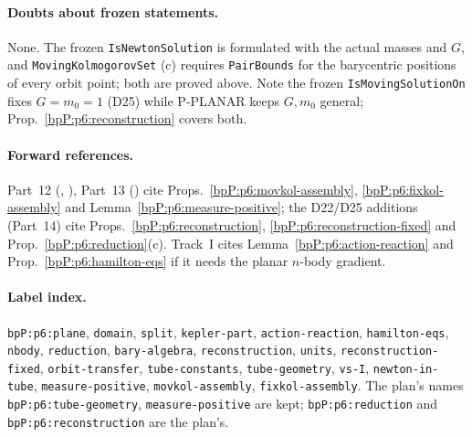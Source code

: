 \paragraph{Doubts about frozen statements.} None. The frozen \texttt{IsNewtonSolution} is formulated with the actual masses and $G$, and \texttt{MovingKolmogorovSet} (c) requires \texttt{PairBounds} for the barycentric positions of every orbit point; both are proved above. Note the frozen \texttt{IsMovingSolutionOn} fixes $G=m_0=1$ (D25) while P-PLANAR keeps $G,m_0$ general; Prop.~\ref{bpP:p6:reconstruction} covers both.

\paragraph{Forward references.} Part~12 (, ), Part~13 () cite Props.~\ref{bpP:p6:movkol-assembly}, \ref{bpP:p6:fixkol-assembly} and Lemma~\ref{bpP:p6:measure-positive}; the D22/D25 additions (Part~14) cite Props.~\ref{bpP:p6:reconstruction}, \ref{bpP:p6:reconstruction-fixed} and Prop.~\ref{bpP:p6:reduction}(c). Track~I cites Lemma~\ref{bpP:p6:action-reaction} and Prop.~\ref{bpP:p6:hamilton-eqs} if it needs the planar $n$-body gradient.

\paragraph{Label index.} \raggedright \texttt{bpP:p6:plane}, \texttt{domain}, \texttt{split}, \texttt{kepler-part}, \texttt{action-reaction}, \texttt{hamilton-eqs}, \texttt{nbody}, \texttt{reduction}, \texttt{bary-algebra}, \texttt{reconstruction}, \texttt{units}, \texttt{reconstruction-fixed}, \texttt{orbit-transfer}, \texttt{tube-constants}, \texttt{tube-geometry}, \texttt{vs-I}, \texttt{newton-in-tube}, \texttt{measure-positive}, \texttt{movkol-assembly}, \texttt{fixkol-assembly}. The plan's names \texttt{bpP:p6:tube-geometry}, \texttt{measure-positive} are kept; \texttt{bpP:p6:reduction} and \texttt{bpP:p6:reconstruction} are the plan's.
\par\endgroup
